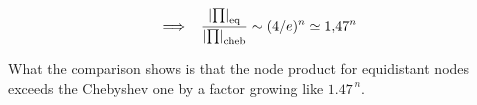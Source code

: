 \documentclass{article}
\begin{document}
\begin{align*}
    \Longrightarrow \hspace{3mm} \frac{\left|\prod\right|_{\text{eq}}}{\left|\prod\right|_{\text{cheb}}} \sim (4/e)^n \simeq 1{,}47^n
\end{align*}

What the comparison shows is that the node product for equidistant nodes exceeds the Chebyshev one by a factor growing like $1.47^{\,n}$.
\end{document}
